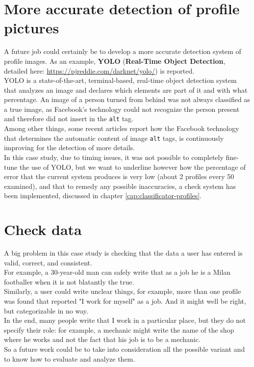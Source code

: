 \section{More accurate detection of profile pictures}
A future job could certainly be to develop a more accurate detection system of profile images. As an example, \textbf{YOLO} (\textbf{Real-Time Object Detection}, detailed here: \url{https://pjreddie.com/darknet/yolo/}) is reported.\\
YOLO is a state-of-the-art, terminal-based, real-time object detection system that analyzes an image and declares which elements are part of it and with what percentage. An image of a person turned from behind was not always classified as a true image, as Facebook's technology could not recognize the person present and therefore did not insert in the \texttt{alt} tag.\\
Among other things, some recent articles report how the Facebook technology that determines the automatic content of image \texttt{alt} tags, is continuously improving for the detection of more details.\\
In this case study, due to timing issues, it was not possible to completely fine-tune the use of YOLO, but we want to underline however how the percentage of error that the current system produces is very low (about 2 profiles every 50 examined), and that to remedy any possible inaccuracies, a check system has been implemented, discussed in chapter \ref{cap:classificator-profiles}.

\section{Check data}
A big problem in this case study is checking that the data a user has entered is valid, correct, and consistent.
\\For example, a 30-year-old man can safely write that as a job he is a Milan footballer when it is not blatantly the true. \\Similarly, a user could write unclear things, for example, more than one profile was found that reported "I work for myself" as a job. And it might well be right, but categorizable in no way. \\In the end, many people write that I work in a particular place, but they do not specify their role: for example, a mechanic might write the name of the shop where he works and not the fact that his job is to be a mechanic.
\\So a future work could be to take into consideration all the possible variant and to know how to evaluate and analyze them.
